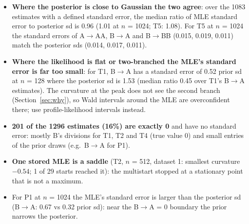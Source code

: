 \documentclass[10pt,a4paper]{article}
\newcommand{\BA}{B$\to$A}
\begin{document}
\begin{itemize}
\item \textbf{Where the posterior is close to Gaussian the two agree}: over the 1083 estimates with a defined standard error, the median ratio of MLE standard error to posterior sd is 0.96 (1.01 at $n$ = 1024; T5: 1.08). For T5 at $n$ = 1024 the standard errors of A$\to$AA, \BA{} and B$\to$BB (0.015, 0.019, 0.011) match the posterior sds (0.014, 0.017, 0.011).
\item \textbf{Where the likelihood is flat or two-branched the MLE's standard error is far too small}: for T1, \BA{} has a standard error of 0.52 prior sd at $n$ = 128 where the posterior sd is 1.53 (median ratio 0.45 over T1's \BA{} estimates). The curvature at the peak does not see the second branch (Section~\ref{sec:why}), so Wald intervals around the MLE are overconfident there; use profile-likelihood intervals instead.
\item \textbf{201 of the 1296 estimates (16\%) are exactly 0} and have no standard error: mostly B's divisions for T1, T2 and T4 (true value 0) and small entries of the prior draws (e.g.\ \BA{} for P1).
\item \textbf{One stored MLE is a saddle} (T2, $n$ = 512, dataset 1: smallest curvature $-0.54$; 1 of 29 starts reached it): the multistart stopped at a stationary point that is not a maximum.
\item For P1 at $n$ = 1024 the MLE's standard error is larger than the posterior sd (\BA{}: 0.67 vs 0.32 prior sd): near the \BA{} = 0 boundary the prior narrows the posterior.
\end{itemize}
\end{document}
